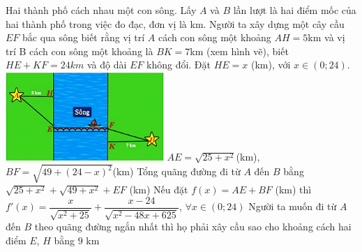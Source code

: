 \begin{ex}%
\immini
{
Hai thành phố cách nhau một con sông. Lấy $A$ và $B$ lần lượt là hai điểm mốc của hai thành phố trong việc đo đạc, đơn vị là km. Người ta xây dựng một cây cầu $EF$ bắc qua sông biết rằng vị trí $A$ cách con sông một khoảng $AH=5$km và vị trí B cách con sông một khoảng là $BK=7$km (xem hình vẽ), biết $HE+KF=24km$ và độ dài $EF$ không đổi.
Đặt $HE=x$ (km), với $x\in\left(0;24\right)$.
}
{
    \includegraphics[width=6cm]{img/HXN-1-15}
}
    \choiceTF
    {\True $AE=\sqrt{25+x^2}$(km), $BF=\sqrt{49+\left(24-x\right)^2}$(km)}
    {Tổng quãng đường đi từ $A$ đến $B$ bằng $\sqrt{25+x^2}+\sqrt{49+x^2}+EF$ (km)}
    {\True Nếu đặt $f(x)=AE+BF$ (km) thì $f'(x)=\dfrac{x}{\sqrt{x^2+25}}+\dfrac{x-24}{\sqrt{x^2-48x+625}}$, $\forall x\in\left(0;24\right)$}
    {Người ta muốn đi từ $A$ đến $B$ theo quãng đường ngắn nhất thì họ phải xây cầu sao cho khoảng cách hai điểm $E$, $H$ bằng $9$ km}
\end{ex}

